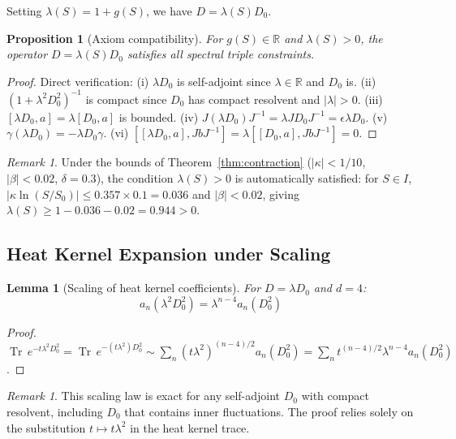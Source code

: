 \documentclass[11pt,a4paper]{article}
\newtheorem{lemma}[theorem]{Lemma}
\newtheorem{proposition}[theorem]{Proposition}
\theoremstyle{remark}
\newtheorem{remark}[theorem]{Remark}
\providecommand{\Tr}{\operatorname{Tr}}
\begin{document}
Setting $\lambda(S) = 1 + g(S)$, we have $D = \lambda(S) D_0$.

\begin{proposition}[Axiom compatibility]
\label{prop:axiom}
For $g(S) \in \mathbb{R}$ and $\lambda(S) > 0$, the operator $D = \lambda(S) D_0$ satisfies all spectral triple constraints.
\end{proposition}

\begin{proof}
Direct verification: (i) $\lambda D_0$ is self-adjoint since $\lambda \in \mathbb{R}$ and $D_0$ is. (ii) $(1 + \lambda^2 D_0^2)^{-1}$ is compact since $D_0$ has compact resolvent and $|\lambda| > 0$. (iii) $[\lambda D_0, a] = \lambda [D_0, a]$ is bounded. (iv) $J(\lambda D_0)J^{-1} = \lambda J D_0 J^{-1} = \epsilon \lambda D_0$. (v) $\gamma(\lambda D_0) = -\lambda D_0 \gamma$. (vi) $[[\lambda D_0, a], JbJ^{-1}] = \lambda[[D_0, a], JbJ^{-1}] = 0$.
\end{proof}

\begin{remark}
Under the bounds of Theorem~\ref{thm:contraction} ($|\kappa| < 1/10$, $|\beta| < 0.02$, $\delta = 0.3$), the condition $\lambda(S) > 0$ is automatically satisfied: for $S \in I$, $|\kappa \ln(S/S_0)| \leq 0.357 \times 0.1 = 0.036$ and $|\beta| < 0.02$, giving $\lambda(S) \geq 1 - 0.036 - 0.02 = 0.944 > 0$.
\end{remark}

\subsection{Heat Kernel Expansion under Scaling}

\begin{lemma}[Scaling of heat kernel coefficients]
For $D = \lambda D_0$ and $d=4$:
\[
  a_n(\lambda^2 D_0^2) = \lambda^{n-4} a_n(D_0^2)
\]
\end{lemma}

\begin{proof}
$\Tr\, e^{-t\lambda^2 D_0^2} = \Tr\, e^{-(t\lambda^2) D_0^2} \sim \sum_n (t\lambda^2)^{(n-4)/2} a_n(D_0^2) = \sum_n t^{(n-4)/2} \lambda^{n-4} a_n(D_0^2)$.
\end{proof}

\begin{remark}
This scaling law is exact for any self-adjoint $D_0$ with compact resolvent, including $D_0$ that contains inner fluctuations. The proof relies solely on the substitution $t \mapsto t\lambda^2$ in the heat kernel trace.
\end{remark}
\end{document}

